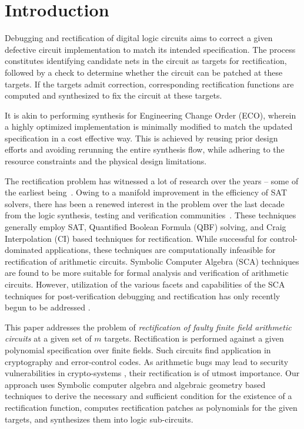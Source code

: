 \section{Introduction}
Debugging and rectification of digital logic circuits aims to correct
a given defective circuit implementation to match its intended
specification. The process constitutes identifying
candidate nets in the circuit as targets for rectification, followed by  
a check to determine whether the circuit can be patched at these
targets. If the targets admit correction, corresponding rectification
functions are computed and synthesized to fix the circuit at these targets.
{\red  
It is akin to performing synthesis for Engineering Change Order 
(ECO), wherein a highly optimized implementation is minimally modified to match the 
updated specification in a cost effective way. This is achieved by reusing prior design 
efforts and avoiding rerunning the entire synthesis flow, while adhering to the resource 
constraints and the physical design limitations.

The rectification problem has witnessed a lot of research over the years -- 
some of the earliest being~\cite{Sadowska:DAC95,scholl:1,andreas:2005}.
Owing to a manifold improvement in the efficiency of SAT solvers,
there has been a renewed interest in the problem over the last decade from 
the logic synthesis, testing and verification communities~\cite{
MF_Huang:DATE12,scholl:2,SS_Fujita:ISQED17,SS_Alan:DAC18}.
These techniques generally employ SAT, Quantified Boolean Formula (QBF) solving,
and Craig Interpolation (CI) based techniques for rectification. While
successful for control-dominated applications, these techniques are
computationally infeasible for rectification of arithmetic circuits.
Symbolic Computer Algebra (SCA) techniques are found to be more
suitable for formal analysis and verification of arithmetic circuits.
However, utilization of the various facets and capabilities of the SCA
techniques for post-verification debugging and rectification has only
recently begun to be addressed
\cite{farimah:2017:1,MF_Rolf:ISVLSI18,Utkarsh:VLSI18,
Vkrao:FMCAD18,Vkrao:ISQED21,Vkrao:GLSVLSI21}. }

This paper addresses the problem of {\it rectification
  of faulty finite field arithmetic circuits} at a given set of $m$
targets. Rectification is performed against a 
given polynomial specification over finite
fields. Such circuits find application in cryptography and error-control codes. 
{\red As arithmetic bugs may lead to security
vulnerabilities in crypto-systems \cite{crypto:bug_attacks}, their
rectification is of utmost importance. 
Our approach uses Symbolic computer algebra and
algebraic geometry based techniques to derive the necessary and sufficient condition
for the existence of a rectification function, computes rectification patches
as polynomials for the given targets, and synthesizes them into logic sub-circuits.}

